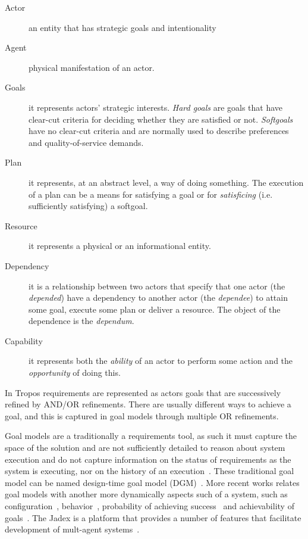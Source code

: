 \begin{description}%
  \item[Actor] an entity that has strategic goals and intentionality

  \item[Agent] physical manifestation of an actor.

  \item[Goals] it represents actors’ strategic interests. \emph{Hard goals} are goals that have clear-cut criteria for deciding whether they are satisfied or not. \emph{Softgoals} have no clear-cut criteria and are normally used to describe preferences and quality-of-service demands.

  \item[Plan] it represents, at an abstract level, a way of doing something. The execution of a plan can be a means for satisfying a goal or for \emph{satisficing} (i.e. sufficiently satisfying) a softgoal.

  \item[Resource]  it represents a physical or an informational entity.

  \item[Dependency] it is a relationship between two actors that specify that one actor (the \emph{depended}) have a dependency to another actor (the \emph{dependee}) to attain some goal, execute some plan or deliver a resource. The object of the dependence is the \emph{dependum}.

  \item[Capability] it represents both the \emph{ability} of an actor to perform some action and the \emph{opportunity} of doing this.

\end{description}


In Tropos requirements are represented as actors goals that are successively refined by AND/OR refinements. There are usually different ways to achieve a goal, and this is captured in goal models through multiple OR refinements.

Goal models are a traditionally a requirements tool, as such it must capture the space of the solution and are not sufficiently detailed to reason about system execution and do not capture information on the status of requirements as the system is executing, nor on the history of an execution~\cite{borgida_requirements_2013}. These traditional goal model can be named design-time goal model (DGM)~\cite{dalpiaz_runtime_2013}.
More recent works relates goal models with another more dynamically aspects such of a system, such as configuration~\cite{yu_goals_2008}, behavior~\cite{dalpiaz_runtime_2013},  probability of achieving success~\cite{mendonca_dependability_2015} and achievability of goals~\cite{pontes_guimaraes_pragmatic_2015}. The Jadex is a platform that provides a number of features that facilitate development of mult-agent systems~\cite{braubach_developing_2012}.

